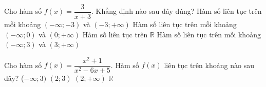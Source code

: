 

\begin{ex}%
	Cho hàm số $f(x)=\dfrac{3}{x+3}$. Khẳng  định nào sau đây đúng?
	 \choice
		{\True Hàm số liên tục trên mỗi khoảng $(-\infty;-3)$ và $(-3;+\infty)$} 
		{Hàm số liên tục trên mỗi khoảng $(-\infty;0)$ và  $(0;+\infty)$}
		{Hàm số liên tục  trên $\mathbb{R}$}
		 {Hàm số liên tục trên mỗi khoảng $(-\infty;3)$ và $(3;+\infty)$}
\end{ex}

\begin{ex}%
	Cho hàm số  $f(x)=\dfrac{x^2+1}{x^2-6x+5}$. Hàm số $f(x)$ liên tục trên khoảng nào sau đây?
	\choice 
		 {($-\infty;3)$}
		{\True $(2;3)$} 
		{$(2;+\infty)$} 
		{$\mathbb{R}$} 
\end{ex}


